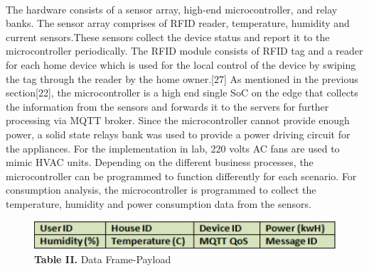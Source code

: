 \documentclass[a4paper,12pt,oneside]{article}
\let\counterwithin\relax
\begin{document}
\paragraph{}
The hardware consists of a sensor array, high-end
microcontroller, and relay banks. The sensor array comprises
of RFID reader, temperature, humidity and current sensors.These sensors collect the device status and report it to the
microcontroller periodically. The RFID module consists of
RFID tag and a reader for each home device which is used for
the local control of the device by swiping the tag through the
reader by the home owner.[27] As mentioned in the previous
section[22], the microcontroller is a high end single SoC on
the edge that collects the information from the sensors and
forwards it to the servers for further processing via MQTT
broker. Since the microcontroller cannot provide enough
power, a solid state relays bank was used to provide a power
driving circuit for the appliances. For the implementation in
lab, 220 volts AC fans are used to mimic HVAC units.
Depending on the different business processes, the
microcontroller can be programmed to function differently for
each scenario. For consumption analysis, the microcontroller
is programmed to collect the temperature, humidity and power
consumption data from the sensors.


\begin{figure}[H]
\includegraphics[width=15cm]{Table2.png}
\centering
\caption{\textbf{Table II.} Data Frame-Payload}
\end{figure}
\end{document}
